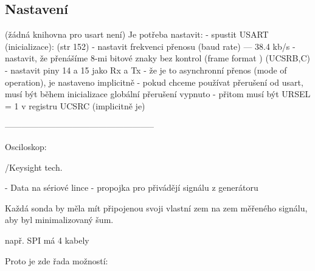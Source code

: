 \subsection{Nastavení}

(žádná knihovna pro usart není)
Je potřeba nastavit: 
- spustit USART (inicializace):  (str 152)
   - nastavit frekvenci přenosu (baud rate)  --- 38.4 kb/s 
   - nastavit, že přenášíme 8-mi bitové znaky bez kontrol  (frame format ) (UCSRB,C)
   - nastavit piny 14 a 15 jako Rx a Tx 
   - že je to  asynchronní přenos (mode of operation), je nastaveno implicitně 
   - pokud chceme používat přerušení od usart, musí být během inicializace 
     globální přerušení vypnuto 
   - přitom musí být URSEL = 1 v registru UCSRC (implicitně je)
   
   
  
  -----------------------------------------------------
  
   Osciloskop: 
   
   /Keysight tech.
   
   
   - Data na sériové lince 
   - propojka pro přivádějí signálu z generátoru 

   Každá sonda by měla mít  připojenou svoji vlastní zem na zem měřeného signálu, aby byl minimalizovaný šum.
   
   např. SPI má 4 kabely 
   
   Proto je zde řada možností: 
 


 
 



 

 

